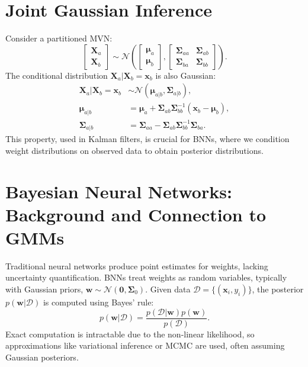 \documentclass[12pt]{article}
\theoremstyle{plain}
\theoremstyle{definition}
\newcommand{\N}{\mathcal{N}}
\begin{document}
\section{Joint Gaussian Inference}
Consider a partitioned MVN:
\begin{equation}
\begin{bmatrix}
\mathbf{X}_a \\
\mathbf{X}_b
\end{bmatrix} \sim \N\left( \begin{bmatrix}
\boldsymbol{\mu}_a \\
\boldsymbol{\mu}_b
\end{bmatrix}, \begin{bmatrix}
\boldsymbol{\Sigma}_{aa} & \boldsymbol{\Sigma}_{ab} \\
\boldsymbol{\Sigma}_{ba} & \boldsymbol{\Sigma}_{bb}
\end{bmatrix} \right).
\end{equation}
The conditional distribution \( \mathbf{X}_a | \mathbf{X}_b = \mathbf{x}_b \) is also Gaussian:
\begin{align}
\mathbf{X}_a | \mathbf{X}_b = \mathbf{x}_b &\sim \N(\boldsymbol{\mu}_{a|b}, \boldsymbol{\Sigma}_{a|b}), \\
\boldsymbol{\mu}_{a|b} &= \boldsymbol{\mu}_a + \boldsymbol{\Sigma}_{ab} \boldsymbol{\Sigma}_{bb}^{-1} (\mathbf{x}_b - \boldsymbol{\mu}_b), \\
\boldsymbol{\Sigma}_{a|b} &= \boldsymbol{\Sigma}_{aa} - \boldsymbol{\Sigma}_{ab} \boldsymbol{\Sigma}_{bb}^{-1} \boldsymbol{\Sigma}_{ba}.
\end{align}
This property, used in Kalman filters, is crucial for BNNs, where we condition weight distributions on observed data to obtain posterior distributions.

\section{Bayesian Neural Networks: Background and Connection to GMMs}
Traditional neural networks produce point estimates for weights, lacking uncertainty quantification. BNNs treat weights as random variables, typically with Gaussian priors, \( \mathbf{w} \sim \N(\mathbf{0}, \boldsymbol{\Sigma}_0) \). Given data \( \mathcal{D} = \{(\mathbf{x}_i, y_i)\} \), the posterior \( p(\mathbf{w} | \mathcal{D}) \) is computed using Bayes' rule:
\begin{equation}
p(\mathbf{w} | \mathcal{D}) = \frac{p(\mathcal{D} | \mathbf{w}) p(\mathbf{w})}{p(\mathcal{D})}.
\end{equation}
Exact computation is intractable due to the non-linear likelihood, so approximations like variational inference or MCMC are used, often assuming Gaussian posteriors.
\end{document}
